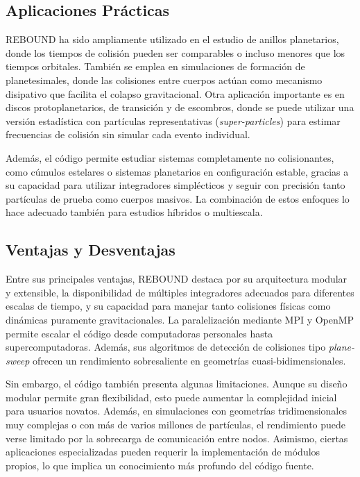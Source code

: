 \subsection{Aplicaciones Prácticas}

REBOUND ha sido ampliamente utilizado en el estudio de anillos planetarios, donde los tiempos de colisión pueden ser comparables o incluso menores que los tiempos orbitales. También se emplea en simulaciones de formación de planetesimales, donde las colisiones entre cuerpos actúan como mecanismo disipativo que facilita el colapso gravitacional. Otra aplicación importante es en discos protoplanetarios, de transición y de escombros, donde se puede utilizar una versión estadística con partículas representativas (\textit{super-particles}) para estimar frecuencias de colisión sin simular cada evento individual.

Además, el código permite estudiar sistemas completamente no colisionantes, como cúmulos estelares o sistemas planetarios en configuración estable, gracias a su capacidad para utilizar integradores simplécticos y seguir con precisión tanto partículas de prueba como cuerpos masivos. La combinación de estos enfoques lo hace adecuado también para estudios híbridos o multiescala.

\subsection{Ventajas y Desventajas}

Entre sus principales ventajas, REBOUND destaca por su arquitectura modular y extensible, la disponibilidad de múltiples integradores adecuados para diferentes escalas de tiempo, y su capacidad para manejar tanto colisiones físicas como dinámicas puramente gravitacionales. La paralelización mediante MPI y OpenMP permite escalar el código desde computadoras personales hasta supercomputadoras. Además, sus algoritmos de detección de colisiones tipo \textit{plane-sweep} ofrecen un rendimiento sobresaliente en geometrías cuasi-bidimensionales.

Sin embargo, el código también presenta algunas limitaciones. Aunque su diseño modular permite gran flexibilidad, esto puede aumentar la complejidad inicial para usuarios novatos. Además, en simulaciones con geometrías tridimensionales muy complejas o con más de varios millones de partículas, el rendimiento puede verse limitado por la sobrecarga de comunicación entre nodos. Asimismo, ciertas aplicaciones especializadas pueden requerir la implementación de módulos propios, lo que implica un conocimiento más profundo del código fuente.

